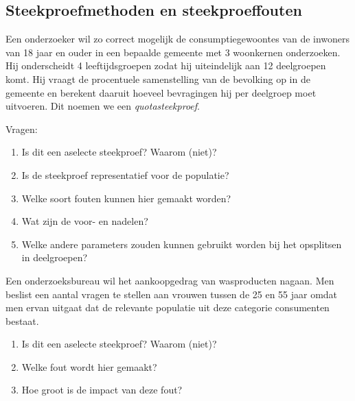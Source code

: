 \subsection{Steekproefmethoden en steekproeffouten}

\begin{exercise}
  Een onderzoeker wil zo correct mogelijk de consumptiegewoontes van de inwoners van 18 jaar en ouder in een bepaalde gemeente met 3 woonkernen onderzoeken.  Hij onderscheidt 4 leeftijdsgroepen zodat hij uiteindelijk aan 12 deelgroepen komt. Hij vraagt de procentuele samenstelling van de bevolking op in de gemeente en berekent daaruit hoeveel bevragingen hij per deelgroep moet uitvoeren. Dit noemen we een \emph{quotasteekproef}.
  
  Vragen:
  \begin{enumerate}[label=\alph*.]
    \item Is dit een aselecte steekproef? Waarom (niet)?
    \item Is de steekproef representatief voor de populatie?
    \item Welke soort fouten kunnen hier gemaakt worden?
    \item Wat zijn de voor- en nadelen?
    \item Welke andere parameters zouden kunnen gebruikt worden bij het opsplitsen in deelgroepen?
  \end{enumerate}
\end{exercise}

\begin{exercise}
  Een onderzoeksbureau wil het aankoopgedrag van wasproducten nagaan. Men beslist een aantal vragen te stellen aan vrouwen tussen de 25 en 55 jaar omdat men ervan uitgaat dat de relevante populatie uit deze categorie consumenten bestaat.
  
  \begin{enumerate}[label=\alph*.]
    \item Is dit een aselecte steekproef? Waarom (niet)?
    \item Welke fout wordt hier gemaakt?
    \item Hoe groot is de impact van deze fout?
  \end{enumerate}
\end{exercise}

